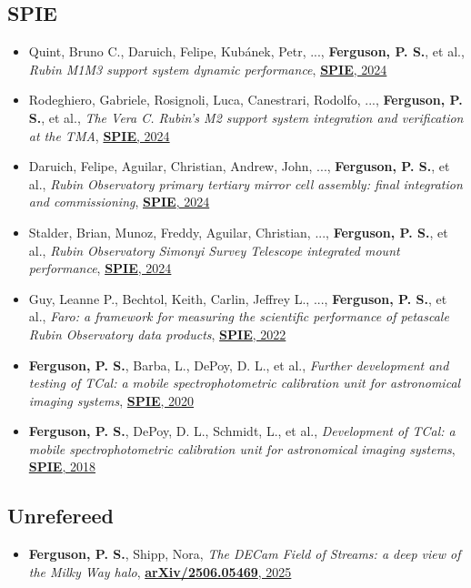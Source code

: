 \subsection{SPIE}
\begin{itemize}[itemsep=1pt]
    \item {Quint}, Bruno C., {Daruich}, Felipe, {Kub{\'a}nek}, Petr, ..., \textbf{Ferguson, P. S.}, et al., \textit{{Rubin M1M3 support system dynamic performance}}, \href{https://ui.adsabs.harvard.edu/abs/2024SPIE13094E..29Q}{\textbf{SPIE}, 2024}
    \item {Rodeghiero}, Gabriele, {Rosignoli}, Luca, {Canestrari}, Rodolfo, ..., \textbf{Ferguson, P. S.}, et al., \textit{{The Vera C. Rubin's M2 support system integration and verification at the TMA}}, \href{https://ui.adsabs.harvard.edu/abs/2024SPIE13094E..2DR}{\textbf{SPIE}, 2024}
    \item {Daruich}, Felipe, {Aguilar}, Christian, {Andrew}, John, ..., \textbf{Ferguson, P. S.}, et al., \textit{{Rubin Observatory primary tertiary mirror cell assembly: final integration and commissioning}}, \href{https://ui.adsabs.harvard.edu/abs/2024SPIE13094E..51D}{\textbf{SPIE}, 2024}
    \item {Stalder}, Brian, {Munoz}, Freddy, {Aguilar}, Christian, ..., \textbf{Ferguson, P. S.}, et al., \textit{{Rubin Observatory Simonyi Survey Telescope integrated mount performance}}, \href{https://ui.adsabs.harvard.edu/abs/2024SPIE13094E..09S}{\textbf{SPIE}, 2024}
    \item {Guy}, Leanne P., {Bechtol}, Keith, {Carlin}, Jeffrey L., ..., \textbf{Ferguson, P. S.}, et al., \textit{{Faro: a framework for measuring the scientific performance of petascale Rubin Observatory data products}}, \href{https://ui.adsabs.harvard.edu/abs/2022SPIE12189E..0MG}{\textbf{SPIE}, 2022}
    \item \textbf{Ferguson, P. S.}, {Barba}, L., {DePoy}, D. L., et al., \textit{{Further development and testing of TCal: a mobile spectrophotometric calibration unit for astronomical imaging systems}}, \href{https://ui.adsabs.harvard.edu/abs/2020SPIE11447E..5UF}{\textbf{SPIE}, 2020}
    \item \textbf{Ferguson, P. S.}, {DePoy}, D. L., {Schmidt}, L., et al., \textit{{Development of TCal: a mobile spectrophotometric calibration unit for astronomical imaging systems}}, \href{https://ui.adsabs.harvard.edu/abs/2018SPIE10702E..3AF}{\textbf{SPIE}, 2018}
\end{itemize}
\subsection{Unrefereed}
\begin{itemize}[itemsep=1pt]
    \item \textbf{Ferguson, P. S.}, {Shipp}, Nora, \textit{{The DECam Field of Streams: a deep view of the Milky Way halo}}, \href{https://ui.adsabs.harvard.edu/abs/2025arXiv250605469F}{\textbf{arXiv/2506.05469}, 2025}
\end{itemize}
